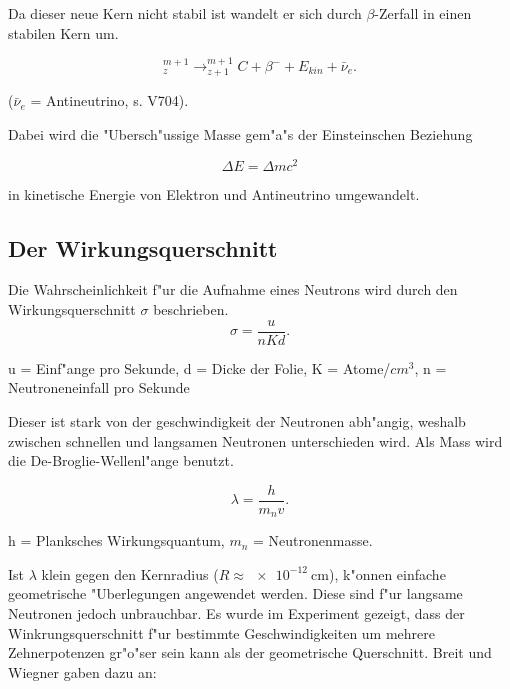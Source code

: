 			Da dieser neue Kern nicht stabil ist wandelt er sich durch $\beta$-Zerfall in einen stabilen Kern um. 

			\begin{equation*}
				^{m+1}_z \rightarrow ^{m+1}_{z+1}C + \beta^- + E_{kin} + \bar{\nu}_e.
			\end{equation*}

			\begin{center}
				\tiny{($\bar{\nu}_e$ = Antineutrino, s. V704).}
			\end{center}

			Dabei wird die "Ubersch"ussige Masse gem"a"s der Einsteinschen Beziehung 

			\begin{equation*}
				\Delta E = \Delta m c^2
			\end{equation*}

			in kinetische Energie von Elektron und Antineutrino umgewandelt.

		\subsection{Der Wirkungsquerschnitt}
		\label{sub:der_wirkungsquerschnitt}
		
			Die Wahrscheinlichkeit f"ur die Aufnahme eines Neutrons wird durch den Wir\-kungs\-quer\-schnitt $\sigma$ beschrieben.
			\newpage
			\begin{equation*}
				\sigma = \frac{u}{nKd}.
			\end{equation*}

			\begin{center}
					\tiny{u = Einf"ange pro Sekunde, d = Dicke der Folie,
					K = Atome/$cm^3$, n = Neutroneneinfall pro Sekunde}
			\end{center}

			Dieser ist stark von der geschwindigkeit der Neutronen abh"angig, weshalb zwischen schnellen und langsamen Neutronen unterschieden wird.
			Als Mass wird die De-Broglie-Wellenl"ange benutzt.

			\begin{equation*}
				\lambda = \frac{h}{m_n v}.
			\end{equation*}

			\begin{center}
					\tiny{h = Planksches Wirkungsquantum, $m_n$ = Neutronenmasse}.
			\end{center}

			Ist $\lambda$ klein gegen den Kernradius ($R \approx \SI{e-12}{\centi\meter}$), k"onnen einfache geometrische "U\-ber\-le\-gung\-en angewendet werden.
			Diese sind f"ur langsame Neutronen jedoch unbrauchbar.
			Es wurde im Experiment gezeigt, dass der Winkrungsquerschnitt f"ur bestimmte Ge\-schwin\-dig\-kei\-ten um mehrere Zehnerpotenzen gr"o"ser sein kann als der geometrische Querschnitt.
			Breit und Wiegner gaben dazu an:

